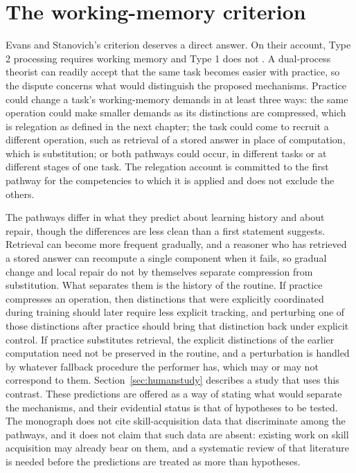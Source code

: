 \documentclass[11pt]{report}
\theoremstyle{remark}
\theoremstyle{definition}
\begin{document}
\section{The working-memory criterion}

Evans and Stanovich's criterion deserves a direct answer. On their account, Type 2 processing requires working memory and Type 1 does not \cite{evans2013}. A dual-process theorist can readily accept that the same task becomes easier with practice, so the dispute concerns what would distinguish the proposed mechanisms. Practice could change a task's working-memory demands in at least three ways: the same operation could make smaller demands as its distinctions are compressed, which is relegation as defined in the next chapter; the task could come to recruit a different operation, such as retrieval of a stored answer in place of computation, which is substitution; or both pathways could occur, in different tasks or at different stages of one task. The relegation account is committed to the first pathway for the competencies to which it is applied and does not exclude the others.

The pathways differ in what they predict about learning history and about repair, though the differences are less clean than a first statement suggests. Retrieval can become more frequent gradually, and a reasoner who has retrieved a stored answer can recompute a single component when it fails, so gradual change and local repair do not by themselves separate compression from substitution. What separates them is the history of the routine. If practice compresses an operation, then distinctions that were explicitly coordinated during training should later require less explicit tracking, and perturbing one of those distinctions after practice should bring that distinction back under explicit control. If practice substitutes retrieval, the explicit distinctions of the earlier computation need not be preserved in the routine, and a perturbation is handled by whatever fallback procedure the performer has, which may or may not correspond to them. Section~\ref{sec:humanstudy} describes a study that uses this contrast. These predictions are offered as a way of stating what would separate the mechanisms, and their evidential status is that of hypotheses to be tested. The monograph does not cite skill-acquisition data that discriminate among the pathways, and it does not claim that such data are absent: existing work on skill acquisition may already bear on them, and a systematic review of that literature is needed before the predictions are treated as more than hypotheses.
\end{document}
